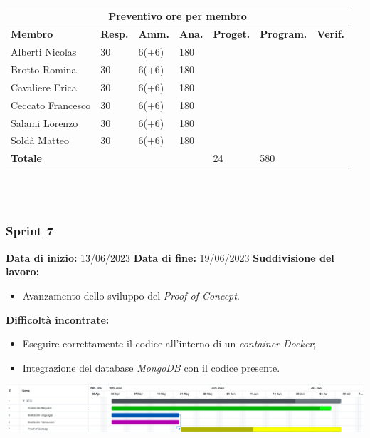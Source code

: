 \documentclass[a4paper, 12pt]{article}
\begin{document}
\begin{center}
	\begin{tabularx}{\textwidth}{|X|X|X|X|X|X|X|}
		\hline
		\multicolumn{7}{|c|}{\textbf{Preventivo ore per membro}}                                      \\
		\hline
		\hline
		\textbf{Membro}  & \textbf{Resp.} & \textbf{Amm.} & \textbf{Ana.} &
		\textbf{Proget.} & \textbf{Program.} & \textbf{Verif.} \\
		\hline
		Alberti Nicolas    	& 30 	& 6(+6)       & 180  & &  &                 \\
		\hline
		Brotto Romina    	& 30 	& 6(+6)       & 180  & &  &                 \\
		\hline
		Cavaliere Erica    	& 30 	& 6(+6)       & 180  & &  &                 \\
		\hline
		Ceccato Francesco    	& 30 	& 6(+6)       & 180  & &   &                \\
		\hline
		Salami Lorenzo    	& 30 	& 6(+6)       & 180  & &     &               \\
		\hline
		Soldà Matteo    	& 30 	& 6(+6)       & 180  & &   &                 \\
		\hline
		\hline
		\textbf{Totale} &    & & & 24           & 580      &               \\
		\hline
	\end{tabularx}\\[8pt]
	\mbox{}\\
\end{center}

\newpage

\subsubsection{Sprint 7}
\textbf{Data di inizio:} 13/06/2023\newline
\textbf{Data di fine:} 19/06/2023\newline
\newline
\textbf{Suddivisione del lavoro:}
\begin{itemize}
    \item Avanzamento dello sviluppo del \textit{Proof of Concept}.
\end{itemize}
\textbf{Difficoltà incontrate:}
\begin{itemize}
    \item Eseguire correttamente il codice all'interno di un \textit{container Docker};
    \item Integrazione del database \textit{MongoDB} con il codice presente.
\end{itemize}
\includegraphics[scale=0.24]{RTB_6.png}\newline
\newline
\end{document}
